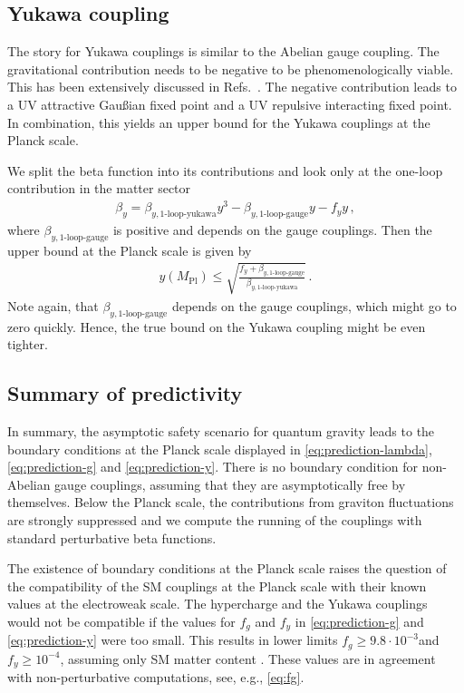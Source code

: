 \documentclass[aps,prd,twocolumn,preprintnumbers,superscriptaddress,nobibnotes,floatfix,longbibliography]{revtex4-1}
\begin{document}
\subsection{Yukawa coupling}
\label{sec:yukawa}
The story for Yukawa couplings is similar to the Abelian gauge coupling.
The gravitational contribution needs to be negative to be phenomenologically viable.
This has been extensively discussed in Refs.~\cite{Rodigast:2009zj,Zanusso:2009bs,Oda:2015sma,Eichhorn:2016esv,1705.02342}.
The negative contribution leads to a UV attractive Gau\ss ian fixed point and a UV repulsive interacting fixed point.
In combination, this yields an upper bound for the Yukawa couplings at the Planck scale.

We split the beta function into its contributions and look only at the one-loop contribution in the matter sector
\begin{align}
 \label{eq:beta-y}
 \beta_y = \beta_{y,\text{1-loop-yukawa}} y^3 - \beta_{y,\text{1-loop-gauge}} y  - f_y y \,,
\end{align}
where $\beta_{y,\text{1-loop-gauge}}$ is positive and depends on the gauge couplings.
Then the upper bound at the Planck scale is given by
\begin{align}
 \label{eq:prediction-y}
 y(M_\text{Pl}) \leq \sqrt{\frac{f_y + \beta_{y,\text{1-loop-gauge}}}{\beta_{y,\text{1-loop-yukawa}}}}\,.
\end{align}
Note again, that $\beta_{y,\text{1-loop-gauge}}$ depends on the gauge couplings, which might go to zero quickly.
Hence, the true bound on the Yukawa coupling might be even tighter.


\subsection{Summary of predictivity}
\label{sec:summary-predictivity}
In summary, the asymptotic safety scenario for quantum gravity leads to the boundary conditions at the Planck scale displayed in \eqref{eq:prediction-lambda}, \eqref{eq:prediction-g} and \eqref{eq:prediction-y}.
There is no boundary condition for non-Abelian gauge couplings, assuming that they are asymptotically free by themselves.
Below the Planck scale, the contributions from graviton fluctuations are strongly suppressed
and we compute the running of the couplings with standard perturbative beta functions.

The existence of boundary conditions at the Planck scale raises the question of the compatibility of the SM couplings at the Planck scale with their known values at the electroweak scale.
The hypercharge and the Yukawa couplings would not be compatible if the values for $f_g$ and $f_y$ in \eqref{eq:prediction-g} and \eqref{eq:prediction-y} were too small.
This results in lower limits $f_g \geq 9.8\cdot10^{-3}$and $f_y\geq 10^{-4}$, assuming only SM matter content \cite{Eichhorn:2018whv}.
These values are in agreement with non-perturbative computations, see, e.g., \eqref{eq:fg}.
\end{document}
